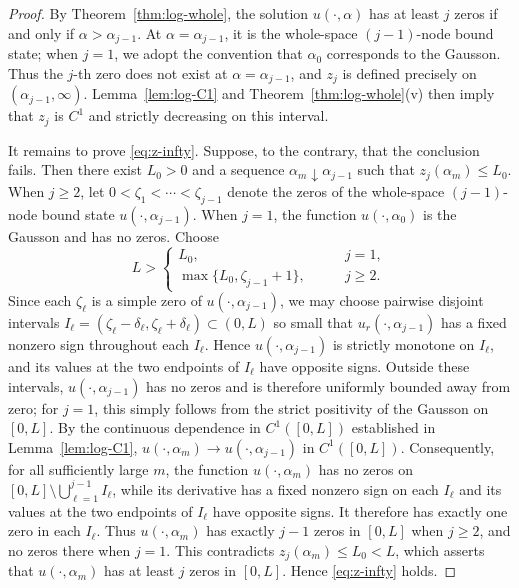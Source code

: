 \documentclass[11pt]{article}
\begin{document}
\begin{proof}
By Theorem~\ref{thm:log-whole}, the solution $u(\cdot,\alpha)$ has at least $j$ zeros if and only if $\alpha>\alpha_{j-1}$. At $\alpha=\alpha_{j-1}$, it is the whole-space $(j-1)$-node bound state;
 when $j=1$, we adopt the convention that $\alpha_0$ corresponds to the Gausson. Thus the $j$-th zero does not exist at $\alpha=\alpha_{j-1}$, and $z_j$ is defined precisely on $(\alpha_{j-1},\infty)$.
 Lemma~\ref{lem:log-C1} and Theorem~\ref{thm:log-whole}(v) then imply that $z_j$ is $C^1$ and strictly decreasing on this interval.

It remains to prove \eqref{eq:z-infty}. Suppose, to the contrary, that the conclusion fails. Then there exist $L_0>0$ and a sequence $\alpha_m\downarrow\alpha_{j-1}$ such that $z_j(\alpha_m)\leq L_0$.
When $j\geq2$, let $0<\zeta_1<\cdots<\zeta_{j-1}$ denote the zeros of the whole-space $(j-1)$-node bound state $u(\cdot,\alpha_{j-1})$. When $j=1$, the function $u(\cdot,\alpha_{0})$ is the Gausson and has no zeros.
 Choose
 \[
L>
\begin{cases}
L_0,\qquad&j=1,\\
\max\{L_0,\zeta_{j-1}+1\},\qquad&j\geq2.
\end{cases}
\]
Since each $\zeta_\ell$ is a simple zero of $u(\cdot,\alpha_{j-1})$,
we may choose pairwise disjoint intervals
$I_\ell=(\zeta_\ell-\delta_\ell,\zeta_\ell+\delta_\ell)\subset(0,L)$ so small that
{$u_r(\cdot,\alpha_{j-1})$ has a fixed nonzero sign
throughout each $I_\ell$.} Hence $u(\cdot,\alpha_{j-1})$ is strictly
monotone on $I_\ell$, and its values at the two endpoints of
$I_\ell$ have opposite signs. Outside these intervals, $u(\cdot,\alpha_{j-1})$ has no zeros and is therefore uniformly bounded away from zero; for $j=1$, this simply follows from the strict positivity of the Gausson on $[0,L]$. By the {continuous dependence in $C^1([0,L])$} established in Lemma~\ref{lem:log-C1}, $u(\cdot,\alpha_m)\rightarrow u(\cdot,\alpha_{j-1})$ in $C^1([0,L])$.
Consequently, for all sufficiently large $m$, the function $u(\cdot,\alpha_m)$ has no zeros on {$[0,L]\setminus \bigcup_{\ell=1}^{j-1}I_{\ell}$},
while its derivative has a fixed nonzero sign on each $I_\ell$ and its values at the two endpoints of $I_\ell$ have opposite signs. It therefore has exactly one zero in each $I_\ell$. Thus $u(\cdot,\alpha_m)$  has exactly $j-1$ zeros in $[0,L]$ when $j\geq2$, and no zeros there when $j=1$.
This contradicts $z_j(\alpha_m)\leq L_0<L$, which asserts that $u(\cdot,\alpha_m)$ has at least $j$ zeros in $[0,L]$. Hence \eqref{eq:z-infty} holds.
\end{proof}
\end{document}
